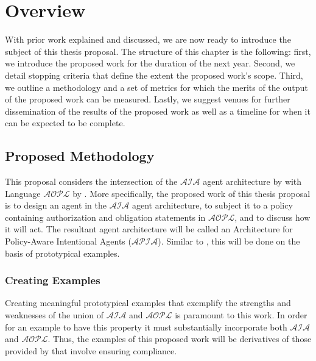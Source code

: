 \chapter{Overview}


With prior work explained and discussed, we are now ready to introduce the subject of this thesis proposal.
The structure of this chapter is the following: first, we introduce the proposed work for the duration of the next year.
Second, we detail stopping criteria that define the extent the proposed work's scope.
Third, we outline a methodology and a set of metrics for which the merits of the output of the proposed work can be measured.
Lastly, we suggest venues for further dissemination of the results of the proposed work as well as a timeline for when it can be expected to be complete.

\section{Proposed Methodology}

This proposal considers the intersection of the $\mathcal{AIA}$ agent architecture by \citet{blount_towards_2014} with Language $\mathcal{AOPL}$ by \citet{gelfond_authorization_2008}.
More specifically, the proposed work of this thesis proposal is to design an agent in the $\mathcal{AIA}$ agent architecture, to subject it to a policy containing authorization and obligation statements in $\mathcal{AOPL}$, and to discuss how it will act.
The resultant agent architecture will be called an Architecture for Policy-Aware Intentional Agents ($\mathcal{APIA}$).
Similar to \citet{blount_towards_2014}, this will be done on the basis of prototypical examples.

\subsection{Creating Examples}

Creating meaningful prototypical examples that exemplify the strengths and weaknesses of the union of $\mathcal{AIA}$ and $\mathcal{AOPL}$ is paramount to this work.
In order for an example to have this property it must substantially incorporate both $\mathcal{AIA}$ and $\mathcal{AOPL}$.
Thus, the examples of this proposed work will be derivatives of those provided by \citet{blount_towards_2014} that involve ensuring compliance.

